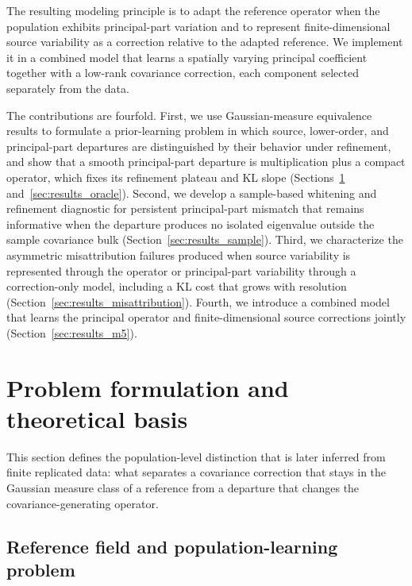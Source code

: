 \documentclass[11pt]{article}
\numberwithin{table}{section}
\numberwithin{figure}{section}
\begin{document}
The resulting modeling principle is to adapt the reference operator when the population exhibits principal-part variation and to represent finite-dimensional source variability as a correction relative to the adapted reference. We implement it in a combined model that learns a spatially varying principal coefficient together with a low-rank covariance correction, each component selected separately from the data.

The contributions are fourfold. First, we use Gaussian-measure equivalence results to formulate a prior-learning problem in which source, lower-order, and principal-part departures are distinguished by their behavior under refinement, and show that a smooth principal-part departure is multiplication plus a compact operator, which fixes its refinement plateau and KL slope (Sections~\ref{sec:theory} and~\ref{sec:results_oracle}). Second, we develop a sample-based whitening and refinement diagnostic for persistent principal-part mismatch that remains informative when the departure produces no isolated eigenvalue outside the sample covariance bulk (Section~\ref{sec:results_sample}). Third, we characterize the asymmetric misattribution failures produced when source variability is represented through the operator or principal-part variability through a correction-only model, including a KL cost that grows with resolution (Section~\ref{sec:results_misattribution}). Fourth, we introduce a combined model that learns the principal operator and finite-dimensional source corrections jointly (Section~\ref{sec:results_m5}).

\section{Problem formulation and theoretical basis}
\label{sec:theory}

This section defines the population-level distinction that is later inferred from finite replicated data: what separates a covariance correction that stays in the Gaussian measure class of a reference from a departure that changes the covariance-generating operator.

\subsection{Reference field and population-learning problem}
\label{sec:reference}
\end{document}
